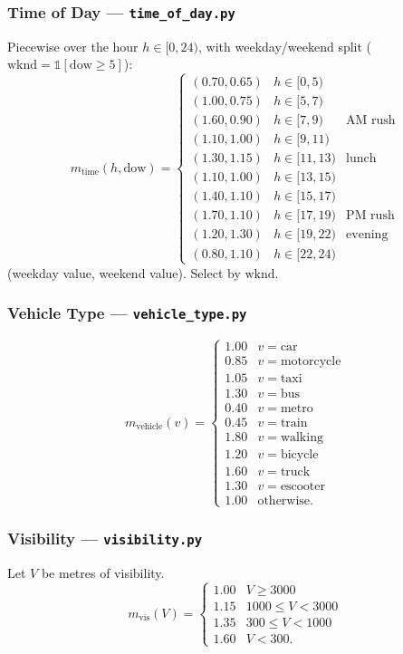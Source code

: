 \documentclass[12pt,a4paper]{article}
\begin{document}
\subsubsection{Time of Day — \texttt{time\_of\_day.py}}

Piecewise over the hour $h\in[0,24)$, with weekday/weekend split ($\text{wknd} = \mathbb{1}[\text{dow}\ge 5]$):
\[
m_{\text{time}}(h,\text{dow}) =
\begin{cases}
(0.70, 0.65) & h\in[0,5) \\
(1.00, 0.75) & h\in[5,7) \\
(1.60, 0.90) & h\in[7,9)   & \text{AM rush} \\
(1.10, 1.00) & h\in[9,11) \\
(1.30, 1.15) & h\in[11,13) & \text{lunch} \\
(1.10, 1.00) & h\in[13,15) \\
(1.40, 1.10) & h\in[15,17) \\
(1.70, 1.10) & h\in[17,19) & \text{PM rush} \\
(1.20, 1.30) & h\in[19,22) & \text{evening} \\
(0.80, 1.10) & h\in[22,24)
\end{cases}
\]
(weekday value, weekend value). Select by $\text{wknd}$.

\subsubsection{Vehicle Type — \texttt{vehicle\_type.py}}
\[
m_{\text{vehicle}}(v) = \begin{cases}
1.00 & v=\text{car} \\
0.85 & v=\text{motorcycle} \\
1.05 & v=\text{taxi} \\
1.30 & v=\text{bus} \\
0.40 & v=\text{metro} \\
0.45 & v=\text{train} \\
1.80 & v=\text{walking} \\
1.20 & v=\text{bicycle} \\
1.60 & v=\text{truck} \\
1.30 & v=\text{escooter} \\
1.00 & \text{otherwise.}
\end{cases}
\]

\subsubsection{Visibility — \texttt{visibility.py}}
Let $V$ be metres of visibility.
\[
m_{\text{vis}}(V) =
\begin{cases}
1.00 & V\ge 3000 \\
1.15 & 1000 \le V < 3000 \\
1.35 & 300  \le V < 1000 \\
1.60 & V < 300.
\end{cases}
\]
\end{document}
